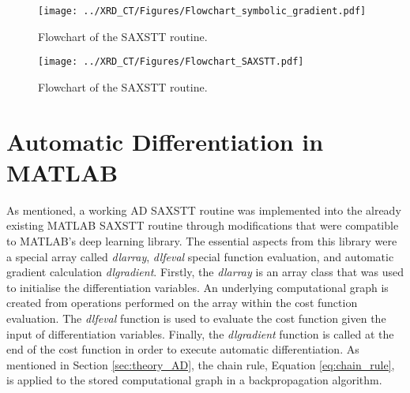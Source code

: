 \begin{figure}
    \centering
    \texttt{[image: ../XRD\_CT/Figures/Flowchart\_symbolic\_gradient.pdf]}
    \caption{Flowchart of the SAXSTT routine.}
    \label{fig:flowchart_gradients}
\end{figure}

\begin{figure}
    \centering
    \texttt{[image: ../XRD\_CT/Figures/Flowchart\_SAXSTT.pdf]} %
    \caption{Flowchart of the SAXSTT routine.}
    \label{fig:flowchart_SAXSTT}
\end{figure}

\section{Automatic Differentiation in MATLAB}%
\label{sec:AD_matlab}
As mentioned,
a working AD SAXSTT routine was implemented into the already existing MATLAB SAXSTT routine
through modifications that were compatible to MATLAB's deep learning library.
The essential aspects from this library were a special array called \emph{dlarray},
\emph{dlfeval} special function evaluation, and automatic gradient calculation \emph{dlgradient}.
Firstly, the \emph{dlarray} is an array class that was used to initialise the differentiation variables.
An underlying computational graph is created from operations performed on the array within the cost function evaluation.
The \emph{dlfeval} function is used to evaluate the cost function given the input of differentiation variables.
Finally, the \emph{dlgradient} function is called at the end of the cost function in order to execute automatic differentiation.
As mentioned in Section \ref{sec:theory_AD}, the chain rule, Equation \eqref{eq:chain_rule}, is applied to the stored computational graph in a backpropagation algorithm.

